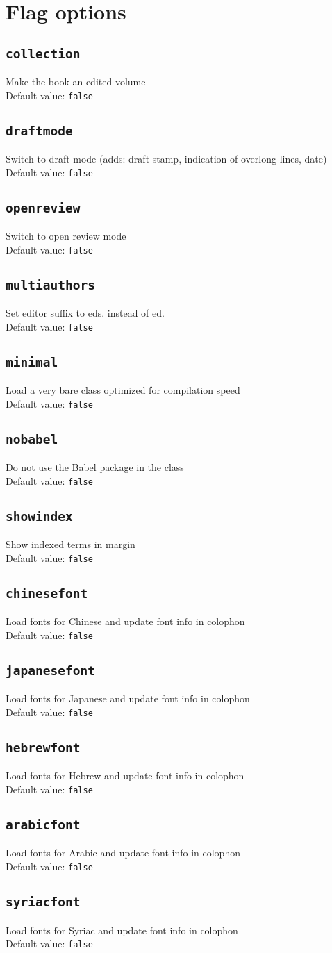 \documentclass[%
output=guidelines,guidelines]{../langscibook}
\newcommand{\option}[3]{\subsection{\texttt{#1}}{#2}\\Default value: {\texttt{#3}}}
\begin{document}
\section{Flag options}
\option{collection}{Make the book an edited volume}{false}
\option{draftmode}{Switch to draft mode (adds: draft stamp, indication of overlong lines, date)}{false}
\option{openreview}{Switch to open review mode}{false}
\option{multiauthors}{Set editor suffix to eds. instead of ed.}{false}
\option{minimal}{Load a very bare class optimized for compilation speed}{false}
\option{nobabel}{Do not use the Babel package in the class}{false}
\option{showindex}{Show indexed terms in margin}{false}
\option{chinesefont}{Load fonts for Chinese and update font info in colophon}{false}
\option{japanesefont}{Load fonts for Japanese and update font info in colophon}{false}
\option{hebrewfont}{Load fonts for Hebrew and update font info in colophon}{false}
\option{arabicfont}{Load fonts for Arabic and update font info in colophon}{false}
\option{syriacfont}{Load fonts for Syriac and update font info in colophon}{false}
\end{document}
